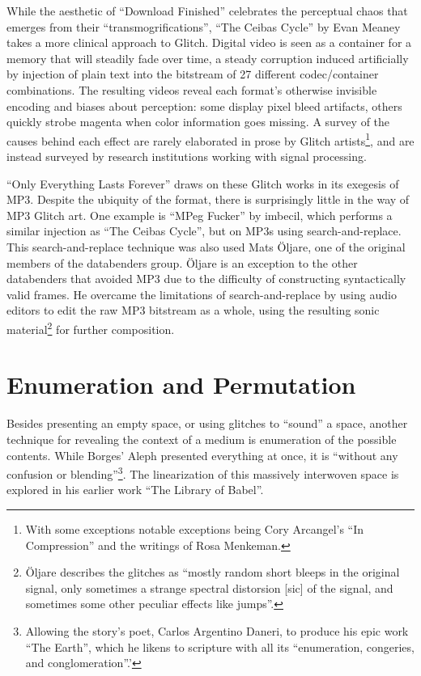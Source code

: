 \documentclass{thesis}
\begin{document}
While the aesthetic of ``Download Finished'' celebrates the perceptual chaos that emerges from their ``transmogrifications'', ``The Ceibas Cycle'' by Evan Meaney\cite{evan_meaney_ceibas:_2008} takes a more clinical approach to Glitch. Digital video is seen as a container for a memory that will steadily fade over time, a steady corruption induced artificially by injection of plain text into the bitstream of 27 different codec/container combinations. The resulting videos reveal each format's otherwise invisible encoding and biases about perception: some display pixel bleed artifacts, others quickly strobe magenta when color information goes missing. A survey of the causes behind each effect are rarely elaborated in prose by Glitch artists\footnote{With some exceptions notable exceptions being Cory Arcangel's ``In Compression'' and the writings of Rosa Menkeman.}, and are instead surveyed by research institutions working with signal processing\cite{nikolai_trunichkin_and_dr._dmitriy_vatolin_crazy_????}.

``Only Everything Lasts Forever'' draws on these Glitch works in its exegesis of MP3. Despite the ubiquity of the format, there is surprisingly little in the way of MP3 Glitch art. One example is ``MPeg Fucker'' by imbecil\cite{imbecil_mpeg_2004}, which performs a similar injection as ``The Ceibas Cycle'', but on MP3s using search-and-replace. This search-and-replace technique was also used Mats \"Oljare, one of the original members of the databenders group. \"Oljare is an exception to the other databenders that avoided MP3 due to the difficulty of constructing syntactically valid frames. He overcame the limitations of search-and-replace by using audio editors to edit the raw MP3 bitstream as a whole, using the resulting sonic material\footnote{\"Oljare describes the glitches as ``mostly random short bleeps in the original signal, only sometimes a strange spectral distorsion [sic] of the signal, and sometimes some other peculiar effects like jumps''.} for further composition.

\section{Enumeration and Permutation}
	
Besides presenting an empty space, or using glitches to ``sound'' a space, another technique for revealing the context of a medium is enumeration of the possible contents. While Borges' Aleph presented everything at once, it is ``without any confusion or blending''\footnote{Allowing the story's poet, Carlos Argentino Daneri, to produce his epic work ``The Earth'', which he likens to scripture with all its ``enumeration, congeries, and conglomeration''.'}. The linearization of this massively interwoven space is explored in his earlier work ``The Library of Babel''\cite{borges_library_2000}.
	
\end{document}
